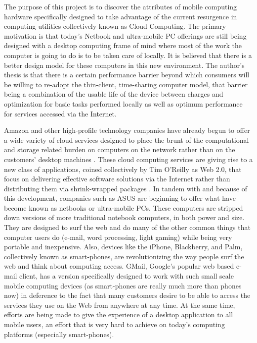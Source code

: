 The purpose of this project is to discover the attributes of mobile computing
hardware specifically designed to take advantage of the current resurgence in
computing utilities collectively known as Cloud Computing.  The primary
motivation is that today's Netbook and ultra-mobile PC offerings are still being
designed with a desktop computing frame of mind where most of the work the
computer is going to do is to be taken care of locally.  It is believed that
there is a better design model for these computers in this new environment.  The
author's thesis is that there is a certain performance barrier beyond which
consumers will be willing to re-adopt the thin-client, time-sharing computer
model, that barrier being a combination of the usable life of the device between
charges and optimization for basic tasks performed locally as well as optimum
performance for services accessed via the Internet.

Amazon and other high-profile technology companies have already begun to offer a
wide variety of cloud services designed to place the brunt of the computational
and storage related burden on computers on the network rather than on the
customers' desktop machines \citep{reiss2008}.  These cloud computing services
are giving rise to a new class of applications, coined collectively by Tim
O'Reilly as Web 2.0, that focus on delivering effective software solutions via
the Internet rather than distributing them via shrink-wrapped packages
\citep{bleicher2006}.  In tandem with and because of this development, companies
such as ASUS are beginning to offer what have become known as netbooks or
ultra-mobile PCs.  These computers are stripped down versions of more
traditional notebook computers, in both power and size.  They are designed to
surf the web and do many of the other common things that computer users do
(e-mail, word processing, light gaming) while being very portable and
inexpensive.  Also, devices like the iPhone, Blackberry, and Palm, collectively
known as smart-phones, are revolutionizing the way people surf the web and think
about computing access.  GMail, Google's popular web based e-mail client, has a
version specifically designed to work with such small scale mobile computing
devices (as smart-phones are really much more than phones now) in deference to
the fact that many customers desire to be able to access the services they use
on the Web from anywhere at any time.  At the same time, efforts are being made
to give the experience of a desktop application to all mobile users, an effort
that is very hard to achieve on today's computing platforms (especially
smart-phones).

